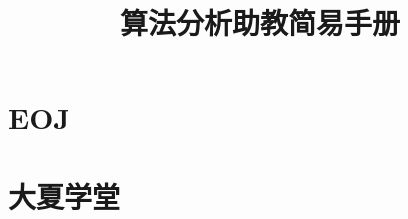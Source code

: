 \documentclass{article}
\title{算法分析助教简易手册}
\author{}
\date{}
\begin{document}
\maketitle

\section{EOJ}

\section{大夏学堂}
\end{document}
